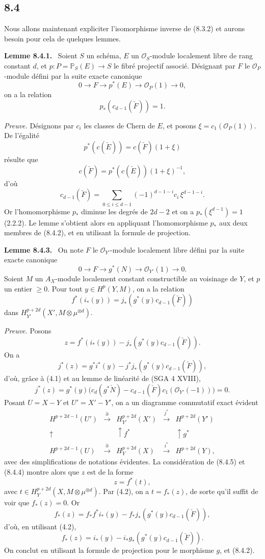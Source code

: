 \documentclass[11pt]{article}
\newenvironment{statement}[1]{\par\medskip\noindent\textbf{#1.}\ }{\par\medskip}
\begin{document}
\subsection*{8.4}

Nous allons maintenant expliciter l'isomorphisme inverse de (8.3.2) et aurons besoin pour cela de quelques lemmes.

\begin{statement}{Lemme 8.4.1}
Soient $S$ un schéma, $E$ un $\mathcal O_S$-module localement libre de rang constant $d$, et $p:P=\mathbb P_S(E)\to S$ le fibré projectif associé. Désignant par $F$ le $\mathcal O_P$-module défini par la suite exacte canonique
\[
0\to F\to p^*(E)\to\mathcal O_P(1)\to0,
\]
on a la relation
\[
p_*(c_{d-1}(\check F))=1.
\]
\end{statement}

\emph{Preuve.} Désignons par $c_i$ les classes de Chern de $E$, et posons $\xi=c_1(\mathcal O_P(1))$. De l'égalité
\[
p^*(c(\check E))=c(\check F)(1+\xi)
\]
résulte que
\[
c(\check F)=p^*(c(\check E))(1+\xi)^{-1},
\]
d'où
\[
c_{d-1}(\check F)=\sum_{0\le i\le d-1}(-1)^{d-1-i}c_i\,\xi^{d-1-i}.
\tag{8.4.2}
\]
Or l'homomorphisme $p_*$ diminue les degrés de $2d-2$ et on a $p_*(\xi^{d-1})=1$ (2.2.2). Le lemme s'obtient alors en appliquant l'homomorphisme $p_*$ aux deux membres de (8.4.2), et en utilisant la formule de projection.

\begin{statement}{Lemme 8.4.3}
On note $F$ le $\mathcal O_{Y'}$-module localement libre défini par la suite exacte canonique
\[
0\to F\to g^*(N)\to\mathcal O_{Y'}(1)\to0.
\]
Soient $M$ un $A_X$-module localement constant constructible au voisinage de $Y$, et $p$ un entier $\ge0$. Pour tout $y\in H^p(Y,M)$, on a la relation
\[
f^*(i_*(y))=j_*(g^*(y)c_{d-1}(\check F))
\]
dans $H_{Y'}^{p+2d}(X',M\otimes\mu^{\otimes d})$.
\end{statement}

\emph{Preuve.} Posons
\[
z=f^*(i_*(y))-j_*(g^*(y)c_{d-1}(\check F)).
\]
On a
\[
j^*(z)=g^*i^*(y)-j^*j_*(g^*(y)c_{d-1}(\check F)),
\]
d'où, grâce à (4.1) et au lemme de linéarité de (SGA 4 XVIII),
\[
j^*(z)=g^*(y)\bigl(c_d(g^*\check N)-c_{d-1}(\check F)c_1(\mathcal O_{Y'}(-1))\bigr)=0.
\tag{8.4.4}
\]
Posant $U=X-Y$ et $U'=X'-Y'$, on a un diagramme commutatif exact évident
\[
\begin{array}{ccccc}
H^{p+2d-1}(U')&\xrightarrow{\partial}&H^{p+2d}_{Y'}(X')&\xrightarrow{j^*}&H^{p+2d}(Y')\\
\uparrow&&\uparrow f^*&&\uparrow g^*\\
H^{p+2d-1}(U)&\xrightarrow{\partial}&H_Y^{p+2d}(X)&\xrightarrow{i^*}&H^{p+2d}(Y),
\end{array}
\tag{8.4.5}
\]
avec des simplifications de notations évidentes. La considération de (8.4.5) et (8.4.4) montre alors que $z$ est de la forme
\[
z=f^*(t),
\]
avec $t\in H_Y^{p+2d}(X,M\otimes\mu^{\otimes d})$. Par (4.2), on a $t=f_*(z)$, de sorte qu'il suffit de voir que $f_*(z)=0$. Or
\[
f_*(z)=f_*f^*i_*(y)-f_*j_*(g^*(y)c_{d-1}(\check F)),
\]
d'où, en utilisant (4.2),
\[
f_*(z)=i_*(y)-i_*g_*(g^*(y)c_{d-1}(\check F)).
\]
On conclut en utilisant la formule de projection pour le morphisme $g$, et (8.4.2).
\end{document}

